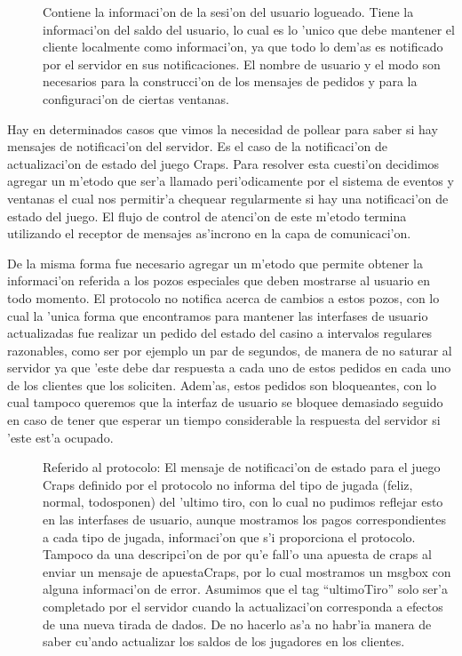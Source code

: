 \begin{description}
\item[] Contiene la informaci'on de la sesi'on del usuario logueado. Tiene la informaci'on del saldo del usuario, lo cual es lo 'unico que debe mantener el cliente localmente como informaci'on, ya que todo lo dem'as es notificado por el servidor en sus notificaciones. El nombre de usuario y el modo son necesarios para la construcci'on de los mensajes de pedidos y para la configuraci'on de ciertas ventanas.
\end{description}

Hay en determinados casos que vimos la necesidad de pollear para saber si hay mensajes de notificaci'on del servidor. Es el caso de la notificaci'on de actualizaci'on de estado del juego Craps. Para resolver esta cuesti'on decidimos agregar un m'etodo  que ser'a llamado peri'odicamente por el sistema de eventos y ventanas el cual nos permitir'a chequear regularmente si hay una notificaci'on de estado del juego. El flujo de control de atenci'on de este m'etodo termina utilizando el receptor de mensajes as'incrono en la capa de comunicaci'on.

De la misma forma fue necesario agregar un m'etodo  que permite obtener la informaci'on referida a los pozos especiales que deben mostrarse al usuario en todo momento. El protocolo no notifica acerca de cambios a estos pozos, con lo cual la 'unica forma que encontramos para mantener las interfases de usuario actualizadas fue realizar un pedido del estado del casino a intervalos regulares razonables, como ser por ejemplo un par de segundos, de manera de no saturar al servidor ya que 'este debe dar respuesta a cada uno de estos pedidos en cada uno de los clientes que los soliciten. Adem'as, estos pedidos son bloqueantes, con lo cual tampoco queremos que la interfaz de usuario se bloquee demasiado seguido en caso de tener que esperar un tiempo considerable la respuesta del servidor si 'este est'a ocupado.

\begin{description}
\item[] Referido al protocolo: El mensaje de notificaci'on de estado para el juego Craps definido por el protocolo no informa del tipo de jugada (feliz, normal, todosponen) del 'ultimo tiro, con lo cual no pudimos reflejar esto en las interfases de usuario, aunque mostramos los pagos correspondientes a cada tipo de jugada, informaci'on que s'i proporciona el protocolo. Tampoco da una descripci'on de por qu'e fall'o una apuesta de craps al enviar un mensaje de apuestaCraps, por lo cual mostramos un msgbox con alguna informaci'on de error.
Asumimos que el tag ``ultimoTiro'' solo ser'a completado por el servidor cuando la actualizaci'on corresponda a efectos de una nueva tirada de dados. De no hacerlo as'a no habr'ia manera de saber cu'ando actualizar los saldos de los jugadores en los clientes.
\end{description}

